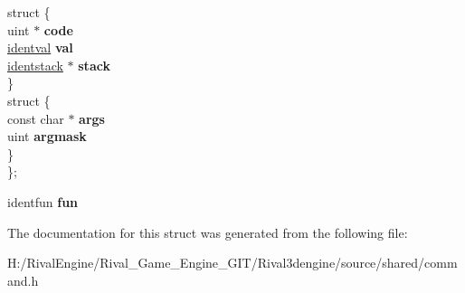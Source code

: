 \begin{DoxyCompactItemize}
\begin{tabbing}
\>struct \{\\
\>\>uint $\ast$ {\bfseries code}\\
\>\>\hyperlink{structidentval}{identval} {\bfseries val}\\
\>\>\hyperlink{structidentstack}{identstack} $\ast$ {\bfseries stack}\\
\>\} \\
\mbox{\label{unionident_1_1_0D148_a47ed46e02c0eed1658473ce8e45bbaa1}} 
\>struct \{\\
\>\>const char $\ast$ {\bfseries args}\\
\>\>uint {\bfseries argmask}\\
\>\} \\
\}; \\

\end{tabbing}\item 
\mbox{\label{structident_ab4f7f6450c494347ba695e547085a913}} 
identfun {\bfseries fun}
\end{DoxyCompactItemize}


The documentation for this struct was generated from the following file\+:\begin{DoxyCompactItemize}
\item 
H\+:/\+Rival\+Engine/\+Rival\+\_\+\+Game\+\_\+\+Engine\+\_\+\+G\+I\+T/\+Rival3dengine/source/shared/command.\+h\end{DoxyCompactItemize}
